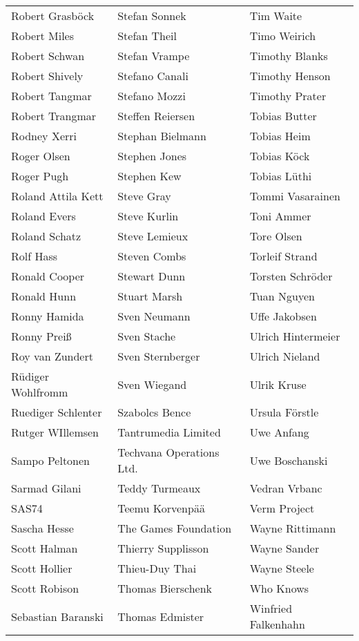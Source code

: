 \begin{small}
\begin{tabular}{p{4cm}p{4cm}p{4cm}}
Robert Grasböck & Stefan Sonnek & Tim Waite \\
Robert Miles & Stefan Theil & Timo Weirich \\
Robert Schwan & Stefan Vrampe & Timothy Blanks \\
Robert Shively & Stefano Canali & Timothy Henson \\
Robert Tangmar & Stefano Mozzi & Timothy Prater \\
Robert Trangmar & Steffen Reiersen & Tobias Butter \\
Rodney Xerri & Stephan Bielmann & Tobias Heim \\
Roger Olsen & Stephen Jones & Tobias Köck \\
Roger Pugh & Stephen Kew & Tobias Lüthi \\
Roland Attila Kett & Steve Gray & Tommi Vasarainen \\
Roland Evers & Steve Kurlin & Toni Ammer \\
Roland Schatz & Steve Lemieux & Tore Olsen \\
Rolf Hass & Steven Combs & Torleif Strand \\
Ronald Cooper & Stewart Dunn & Torsten Schröder \\
Ronald Hunn & Stuart Marsh & Tuan Nguyen \\
Ronny Hamida & Sven Neumann & Uffe Jakobsen \\
Ronny Preiß & Sven Stache & Ulrich Hintermeier \\
Roy van Zundert & Sven Sternberger & Ulrich Nieland \\
Rüdiger Wohlfromm & Sven Wiegand & Ulrik Kruse \\
Ruediger Schlenter & Szabolcs Bence & Ursula Förstle \\
Rutger WIllemsen & Tantrumedia Limited & Uwe Anfang \\
Sampo Peltonen & Techvana Operations Ltd. & Uwe Boschanski \\
Sarmad Gilani & Teddy Turmeaux & Vedran Vrbanc \\
SAS74 & Teemu Korvenpää & Verm Project \\
Sascha Hesse & The Games Foundation & Wayne Rittimann \\
Scott Halman & Thierry Supplisson & Wayne Sander \\
Scott Hollier & Thieu-Duy Thai & Wayne Steele \\
Scott Robison & Thomas Bierschenk & Who Knows \\
Sebastian Baranski & Thomas Edmister & Winfried Falkenhahn \\

\end{tabular}
\end{small}
